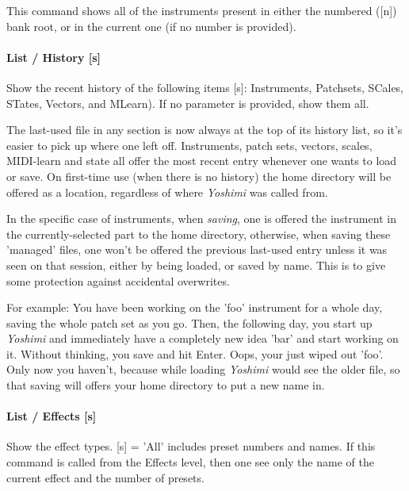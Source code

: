    This command shows all of the instruments present in either the numbered
   ([n]) bank root, or in the current one (if no number is provided).

\paragraph{List / History [s]}
\label{paragraph:command_line_list_history}

   Show the recent history of the following items [s]:
   Instruments, Patchsets, SCales, STates, Vectors, and MLearn).
   If no parameter is provided, show them all.

   The last-used file in any section is now always at the top of its history list,
   so it's easier to pick up where one left off.
   Instruments, patch sets, vectors, scales, MIDI-learn and state all offer the
   most recent entry whenever one wants to load or save.  On first-time use (when
   there is no history) the home directory will be offered as a location,
   regardless of where \textsl{Yoshimi} was called from.

   In the specific case of instruments, when \textsl{saving},
   one is offered the instrument in the currently-selected part to the home
   directory, otherwise, when saving these 'managed' files,
   one won't be offered the previous last-used entry unless it was seen on that
   session, either by being loaded, or saved by name. This is to give some
   protection against accidental overwrites.

   For example:
   You have been working on the 'foo' instrument
   for a whole day, saving the whole patch set as you
   go. Then, the following day, you start up \textsl{Yoshimi}
   and immediately have a completely
   new idea 'bar' and start working on it. Without thinking, you save and hit
   Enter. Oops, your just wiped out 'foo'.
   Only now you haven't, because while loading \textsl{Yoshimi}
   would see the older file, so that saving
   will offers your home directory to put a new name in.

\paragraph{List / Effects [s]}
\label{paragraph:command_line_list_effects}

   Show the effect types.
   [s] = 'All' includes preset numbers and names.
   If this command is called from the Effects level, then one see only the name
   of the current effect and the number of presets.

